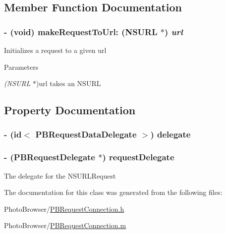 \subsection{Member Function Documentation}
\hypertarget{interface_p_b_request_connection_a014d10ea50c7d8df727f710a681eae30}{
\subsubsection[{makeRequestToUrl:}]{\setlength{\rightskip}{0pt plus 5cm}-\/ (void) makeRequestToUrl: (NSURL $\ast$) {\em url}}}
\label{interface_p_b_request_connection_a014d10ea50c7d8df727f710a681eae30}
Initializes a request to a given url 
\begin{DoxyParams}{Parameters}
\item[{\em (NSURL}]$\ast$)url takes an NSURL \end{DoxyParams}


\subsection{Property Documentation}
\hypertarget{interface_p_b_request_connection_a79f0873c9262a2cbdd23119b13608a51}{
\subsubsection[{delegate}]{\setlength{\rightskip}{0pt plus 5cm}-\/ (id$<$ {\bf PBRequestDataDelegate} $>$) delegate}}
\label{interface_p_b_request_connection_a79f0873c9262a2cbdd23119b13608a51}
\hypertarget{interface_p_b_request_connection_a65d23493156958db1aabd045604095b6}{
\subsubsection[{requestDelegate}]{\setlength{\rightskip}{0pt plus 5cm}-\/ ({\bf PBRequestDelegate} $\ast$) requestDelegate}}
\label{interface_p_b_request_connection_a65d23493156958db1aabd045604095b6}
The delegate for the NSURLRequest 

The documentation for this class was generated from the following files:\begin{DoxyCompactItemize}
\item 
PhotoBrowser/\hyperlink{_p_b_request_connection_8h}{PBRequestConnection.h}\item 
PhotoBrowser/\hyperlink{_p_b_request_connection_8m}{PBRequestConnection.m}\end{DoxyCompactItemize}
